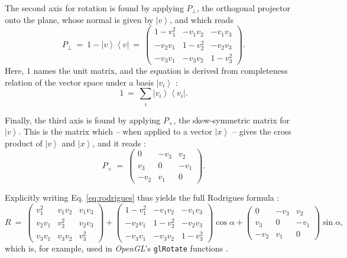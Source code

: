 The second axis for rotation is found by applying $P_{\perp}$, the orthogonal projector onto the plane, 
whose normal is given by $\left|v\right>$, and which reads \cite[p. 814]{Arens2015}
\begin{equation}
	P_{\perp} \ =\ 1 - \left|v\right> \left<v\right| \ =\ 
		\left( \begin{array}{ccc} 
			1 - v_1^2    &      - v_1 v_2 &         - v_1 v_3 \\
			   - v_2 v_1 &      1 - v_2^2 &         - v_2 v_3 \\
			   - v_3 v_1 &      - v_3 v_2 &         1 - v_3^2
		\end{array} \right).
\end{equation}
Here, $1$ names the unit matrix, and the equation is derived from completeness relation of the vector space under
a basis $\left| v_i \right>$ \cite[p. 814]{Arens2015}:
\begin{equation}
	1 \ =\  \sum_i \left| v_i \right> \left< v_i \right|.
\end{equation}

Finally, the third axis is found by applying $P_{\times}$, the skew-symmetric matrix for $\left|v\right>$.
This is the matrix which -- when applied to a vector $\left|x\right>$ -- gives the cross product of $\left|v\right>$ and $\left|x\right>$, 
and it reads \cite{wiki_skewsymm}:
\begin{equation}
	P_{\times} \ =\ 
		\left( \begin{array}{ccc} 
			0     & -v_3 &  v_2 \\
			v_3   & 0    & -v_1 \\
			-v_2  & v_1  & 0
		\end{array} \right).
\end{equation}

Explicitly writing Eq. \ref{eq:rodrigues} thus yields the full Rodrigues formula \cite[p. 718, p. 816]{Arens2015}:
\begin{equation}
	R \ = \ 
		\left( \begin{array}{ccc} 
			v_1^2   &    v_1 v_2 &       v_1 v_3 \\
			v_2 v_1 &      v_2^2 &       v_2 v_3 \\
			v_3 v_1 &    v_3 v_2 &         v_3^2
		\end{array} \right)
	+ 	\left( \begin{array}{ccc} 
			1 - v_1^2    &      - v_1 v_2 &         - v_1 v_3 \\
			   - v_2 v_1 &      1 - v_2^2 &         - v_2 v_3 \\
			   - v_3 v_1 &      - v_3 v_2 &         1 - v_3^2
		\end{array} \right)
		\cos \alpha 
	 + 
		\left( \begin{array}{ccc} 
			0     & -v_3 &  v_2 \\
			v_3   & 0    & -v_1 \\
			-v_2  & v_1  & 0
		\end{array} \right)
		\sin \alpha,
	\label{eq:rodrigues_expl}
\end{equation}
which is, for example, used in \textit{OpenGL}'s  \lstinline[language=C]|glRotate| functions \cite{web_gl_rotate}.

